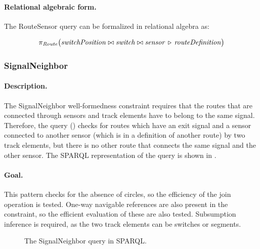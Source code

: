 \paragraph{Relational algebraic form.}  The \textsf{RouteSensor} query can be formalized in relational algebra as:


\[
\pi_{\mathit{Route}} \big( \mathit{switchPosition} \bowtie \mathit{switch} \bowtie \mathit{sensor} \, \triangleright \, \mathit{routeDefinition} \big)
\]

\subsubsection{SignalNeighbor}

\paragraph{Description.} The \textsf{SignalNeighbor} well-formedness constraint requires that the routes that are connected through sensors and track elements have to belong to the same signal. Therefore, the query () checks for routes which have an exit signal and a sensor connected to another sensor (which is in a definition of another route) by two track elements, but there is no other route that connects the same signal and the other sensor. The SPARQL representation of the query is shown in .

\paragraph{Goal.} This pattern checks for the absence of circles, so the efficiency of the join operation is tested. One-way navigable references are also present in the constraint, so the efficient evaluation of these are also tested. Subsumption inference is required, as the two track elements can be switches or segments.

\begin{figure}[Htb]
\centering
\begin{minipage}{0.6\textwidth}
  { \alignListing
    }
  \caption{The \textsf{SignalNeighbor} query in SPARQL.}
  \label{lst:signalneighbor-sparql}
\end{minipage}
\end{figure}

